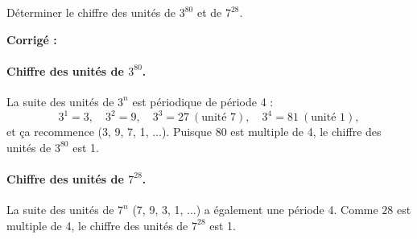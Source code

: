 \documentclass[a4paper,12pt]{article}
\begin{document}
    \begin{exercice}[title=Exercice 20 $\star\star$ { [Calculer] }]{}{}
    Déterminer le chiffre des unités de $3^{80}$ et de $7^{28}$.
    \end{exercice}
    
    \begin{solutionbox}
    \textbf{Corrigé :}
    
    \paragraph{Chiffre des unités de $3^{80}$.}
    La suite des unités de $3^n$ est périodique de période 4 :
    $$
    3^1 = 3,\quad
    3^2 = 9,\quad
    3^3 = 27 \ (\text{unité } 7),\quad
    3^4 = 81 \ (\text{unité } 1),
    $$
    et ça recommence (3, 9, 7, 1, ...).  
    Puisque $80$ est multiple de 4, le chiffre des unités de $3^{80}$ est 1.
    
    \paragraph{Chiffre des unités de $7^{28}$.}
    La suite des unités de $7^n$ (7, 9, 3, 1, ...) a également une période 4.  
    Comme $28$ est multiple de 4, le chiffre des unités de $7^{28}$ est 1.
    \end{solutionbox}
    
\end{document}
